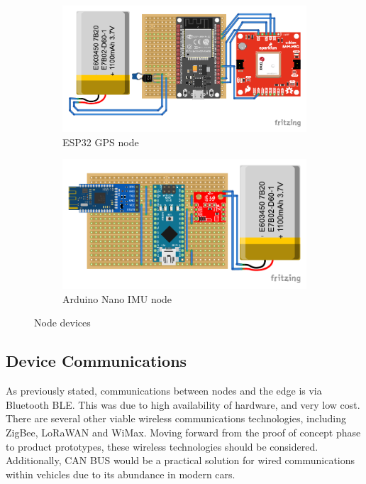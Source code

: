 \documentclass[DIV=current]{scrartcl}
\begin{document}
	\begin{figure}[t]
		\centering
		\begin{subfigure}{0.54\linewidth}
			\includegraphics[width=\linewidth]{images/esp-node.pdf}
			\caption{ESP32 GPS node}
			\label{fig:gps-node}
		\end{subfigure}
		\begin{subfigure}{0.45\linewidth}
			\includegraphics[width=\linewidth]{images/nano-node.pdf}
			\caption{Arduino Nano IMU node}
			\label{fig:imu-node}
		\end{subfigure}
		\caption{Node devices}
	\end{figure}
	
	\subsection{Device Communications}
	As previously stated, communications between nodes and the edge is via Bluetooth BLE. This was due to high availability of hardware, and very low cost. There are several other viable wireless communications technologies, including ZigBee, LoRaWAN and WiMax. Moving forward from the proof of concept phase to product prototypes, these wireless technologies should be considered. Additionally, CAN BUS would be a practical solution for wired communications within vehicles due to its abundance in modern cars.
	
\end{document}
